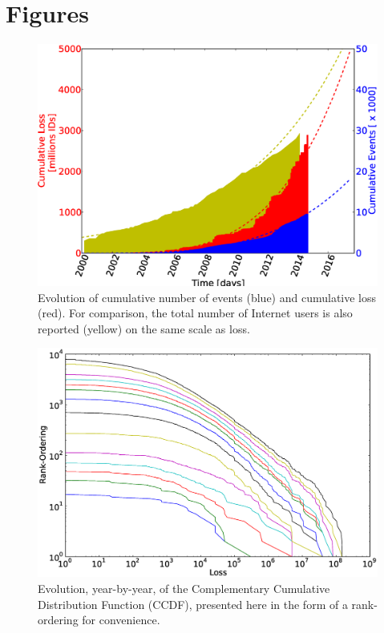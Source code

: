 \section*{Figures}


\begin{figure}[h]
\begin{center}
\includegraphics[width=6in]{../figures/dynamics.eps}
\caption{Evolution of cumulative number of events (blue) and cumulative loss (red). For comparison, the total number of Internet users is also reported (yellow) on the same scale as loss.}
\label{fig:dynamics}
\end{center}
\end{figure}


\begin{figure}[h]
\begin{center}
\includegraphics[width=6in]{../figures/CCDF.eps}
\caption{Evolution, year-by-year, of the Complementary Cumulative Distribution Function (CCDF), presented here in the form of a rank-ordering for convenience.}
\label{fig:dynamics}
\end{center}
\end{figure}